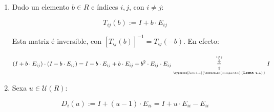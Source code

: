 \documentclass[twoside]{report}
\newcommand{\magbf}[1]{\textcolor{magenta}{\textbf{#1}}} %
\theoremstyle{mystyle}
\begin{document}
\begin{enumerate}
    \item Dado un elemento $b \in R$ e índices $i,j$, con $i \neq j$:
    
    $$T_{ij}(b):= I + b \cdot E_{ij}$$
    
    \begin{center}
    
        
    \end{center}
    
    \vspace{5mm}

    Esta matriz é inversible, con $[T_{ij}(b)]^{-1} = T_{ij}(-b)$. En efecto:
    
    $$(I + b \cdot E_{ij}) \cdot (I - b \cdot E_{ij}) = I - b \cdot E_{ij} + b \cdot E_{ij} + b^{2} \cdot E_{ij} \cdot E_{ij} \underset{\underset{\hyperref[lem4.1]{\magbf{Lema 4.1}}}{\Uparrow}}{\overset{\overset{i \neq j}{\Downarrow}}{=}} I$$

    \item Sexa $u \in \mathcal{U}(R)$:
    
    $$D_{i}(u) := I + (u-1) \cdot E_{ii} = I + u \cdot E_{ii} - E_{ii}$$
    
    \begin{center}
    

\end{center}
\end{enumerate}
\end{document}
